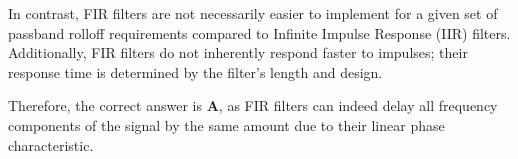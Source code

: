 In contrast, FIR filters are not necessarily easier to implement for a given set of passband rolloff requirements compared to Infinite Impulse Response (IIR) filters. Additionally, FIR filters do not inherently respond faster to impulses; their response time is determined by the filter's length and design.

Therefore, the correct answer is \textbf{A}, as FIR filters can indeed delay all frequency components of the signal by the same amount due to their linear phase characteristic.

